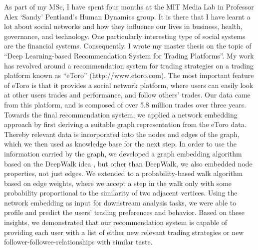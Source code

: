 As part of my MSc, I have spent four months at the MIT Media Lab in Professor Alex `Sandy' Pentland's Human Dynamics group. 
It is there that I have learnt a lot about social networks and how they influence our lives in business, health, governance, and technology.
One particularly interesting type of social systems are the financial systems.
Consequently, I wrote my master thesis on the topic of ``Deep Learning-based Recommendation System for Trading Platforms''. 
My work has revolved around a recommendation system for trading strategies on a trading platform known as ``eToro'' (http://www.etoro.com).
The most important feature of eToro is that it provides a social network platform, where users can easily look at other users trades and performance, and follow others’ trades. 
Our data came from this platform, and is composed of over 5.8 million trades over three years.  
Towards the final recommendation system, we applied a network embedding approach by first deriving a suitable graph representation from the eToro data.
Thereby relevant data is incorporated into the nodes and edges of the graph, which we then used as knowledge base for the next step.
In order to use the information carried by the graph, we developed a graph embedding algorithm based on the DeepWalk idea \cite{perozzi2014deepwalk}, but other than DeepWalk, we also embedded node properties, not just edges.
We extended to a probability-based walk algorithm based on edge weights, where we accept a step in the walk only with some probability proportional to the similarity of two adjacent vertices.
Using the network embedding as input for downstream analysis tasks, we were able to profile and predict the users' trading preferences and behavior. 
Based on these insights, we demonstrated that our recommendation system is capable of providing each user with a list of either new relevant trading strategies or new follower-followee-relationships with similar taste.\\


